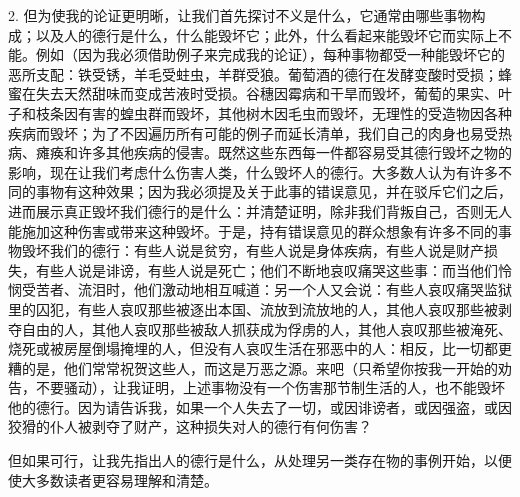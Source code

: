 2. 但为使我的论证更明晰，让我们首先探讨不义是什么，它通常由哪些事物构成；以及人的德行是什么，什么能毁坏它；此外，什么看起来能毁坏它而实际上不能。例如（因为我必须借助例子来完成我的论证），每种事物都受一种能毁坏它的恶所支配：铁受锈，羊毛受蛀虫，羊群受狼。葡萄酒的德行在发酵变酸时受损；蜂蜜在失去天然甜味而变成苦液时受损。谷穗因霉病和干旱而毁坏，葡萄的果实、叶子和枝条因有害的蝗虫群而毁坏，其他树木因毛虫而毁坏，无理性的受造物因各种疾病而毁坏；为了不因遍历所有可能的例子而延长清单，我们自己的肉身也易受热病、瘫痪和许多其他疾病的侵害。既然这些东西每一件都容易受其德行毁坏之物的影响，现在让我们考虑什么伤害人类，什么毁坏人的德行。大多数人认为有许多不同的事物有这种效果；因为我必须提及关于此事的错误意见，并在驳斥它们之后，进而展示真正毁坏我们德行的是什么：并清楚证明，除非我们背叛自己，否则无人能施加这种伤害或带来这种毁坏。于是，持有错误意见的群众想象有许多不同的事物毁坏我们的德行：有些人说是贫穷，有些人说是身体疾病，有些人说是财产损失，有些人说是诽谤，有些人说是死亡；他们不断地哀叹痛哭这些事：而当他们怜悯受苦者、流泪时，他们激动地相互喊道：另一个人又会说：有些人哀叹痛哭监狱里的囚犯，有些人哀叹那些被逐出本国、流放到流放地的人，其他人哀叹那些被剥夺自由的人，其他人哀叹那些被敌人抓获成为俘虏的人，其他人哀叹那些被淹死、烧死或被房屋倒塌掩埋的人，但没有人哀叹生活在邪恶中的人：相反，比一切都更糟的是，他们常常祝贺这些人，而这是万恶之源。来吧（只希望你按我一开始的劝告，不要骚动），让我证明，上述事物没有一个伤害那节制生活的人，也不能毁坏他的德行。因为请告诉我，如果一个人失去了一切，或因诽谤者，或因强盗，或因狡猾的仆人被剥夺了财产，这种损失对人的德行有何伤害？\par

但如果可行，让我先指出人的德行是什么，从处理另一类存在物的事例开始，以便使大多数读者更容易理解和清楚。\par

